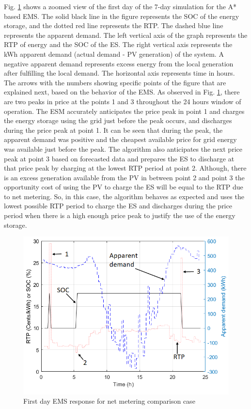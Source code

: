 Fig. \ref{fig:SBMPO_COMP_1_day} shows a zoomed view of the first day of the 7-day simulation for the A* based EMS. The solid black line in the figure represents the SOC of the energy storage, and the dotted red line represents the RTP. The dashed blue line represents the apparent demand. The left vertical axis of the graph represents the RTP of energy and the SOC of the ES. The right vertical axis represents the kWh apparent demand (actual demand - PV generation) of the system. A negative apparent demand represents excess energy from the local generation after fulfilling the local demand. The horizontal axis represents time in hours. The arrows with the numbers showing specific points of the figure that are explained next, based on the behavior of the EMS. As observed in Fig. \ref{fig:SBMPO_COMP_1_day}, there are two peaks in price at the points 1 and 3 throughout the 24 hours window of operation. The ESM accurately anticipates the price peak in point 1 and charges the energy storage using the grid just before the peak occurs, and discharges during the price peak at point 1. It can be seen that during the peak, the apparent demand was positive and the cheapest available price for grid energy was available just before the peak. The algorithm also anticipates the next price peak at point 3 based on forecasted data and prepares the ES to discharge at that price peak by charging at the lowest RTP period at point 2. Although, there is an excess generation available from the PV in between point 2 and point 3 the opportunity cost of using the PV to charge the ES will be equal to the RTP due to net metering. So, in this case, the algorithm behaves as expected and uses the lowest possible RTP period to charge the ES and discharges during the price period when there is a high enough price peak to justify the use of the energy storage.

\begin{figure}[!ht]
    \centering
    \includegraphics[width = 0.8\linewidth]{figs/SBMPO_COMP_1_day.png}
    \caption{First day EMS response for net metering comparison case}
    \label{fig:SBMPO_COMP_1_day}
\end{figure}

